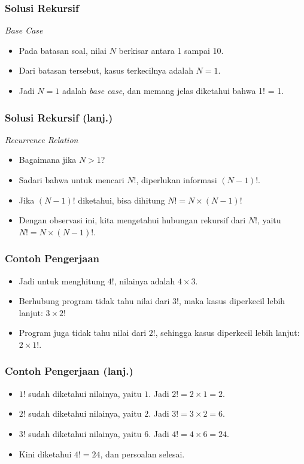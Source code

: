\begin{frame}
\frametitle{Solusi Rekursif}
\textit{Base Case}
\begin{itemize}
  \item Pada batasan soal, nilai $N$ berkisar antara 1 sampai 10.
  \item Dari batasan tersebut, kasus terkecilnya adalah $N=1$.
  \item Jadi $N=1$ adalah \textit{base case}, dan memang jelas diketahui bahwa 1! = 1.
\end{itemize}
\end{frame}

\begin{frame}
\frametitle{Solusi Rekursif (lanj.) }
\textit{Recurrence Relation}
\begin{itemize}
  \item Bagaimana jika $N > 1$?
  \item Sadari bahwa untuk mencari $N!$, diperlukan informasi $(N-1)!$.
  \item Jika $(N-1)!$ diketahui, bisa dihitung $N! = N \times (N-1)!$
  \item Dengan observasi ini, kita mengetahui hubungan rekursif dari $N!$, yaitu $N! = N \times (N-1)!$.
\end{itemize}
\end{frame}

\begin{frame}
\frametitle{Contoh Pengerjaan}
\begin{itemize}
  \item Jadi untuk menghitung $4!$, nilainya adalah $4 \times 3\!$.
  \item Berhubung program tidak tahu nilai dari $3!$, maka kasus diperkecil lebih lanjut: $3 \times 2!$
  \item Program juga tidak tahu nilai dari $2!$, sehingga kasus diperkecil lebih lanjut: $2 \times 1!$.
\end{itemize}
\end{frame}

\begin{frame}
\frametitle{Contoh Pengerjaan (lanj.)}
\begin{itemize}
  \item $1!$ sudah diketahui nilainya, yaitu $1$. Jadi $2! = 2 \times 1 = 2$.
  \item $2!$ sudah diketahui nilainya, yaitu $2$. Jadi $3! = 3 \times 2 = 6$.
  \item $3!$ sudah diketahui nilainya, yaitu $6$. Jadi $4! = 4 \times 6 = 24$.
  \item Kini diketahui $4! = 24$, dan persoalan selesai.
\end{itemize}
\end{frame}

